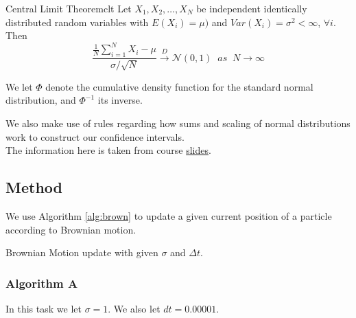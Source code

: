 \begin{theorem}{Central Limit Theorem}{clt}
Let $X_1, X_2, \dots, X_N$ be independent identically distributed random variables with $E(X_i) = \mu)$ and $Var(X_i) = \sigma^2 < \infty $, $\forall i$. Then
$$
    \frac{ \frac{1}{N} \sum^N_{i=1} X_i - \mu } {\sigma / \sqrt{N}} \xrightarrow{D} \mathcal{N}(0,1) \;\; as \;\; N \rightarrow \infty
$$
\end{theorem}

We let $\Phi$ denote the cumulative density function for the standard normal distribution, and $\Phi^{-1}$ its inverse.

We also make use of rules regarding how sums and scaling of normal distributions work to construct our confidence intervals.
\\

The information here is taken from course  \href{https://www.canvas.umu.se/courses/6705/files/1636770}{slides}.

\subsection{Method}
\label{sec:method2}


We use Algorithm \ref{alg:brown} to update a given current position of a particle according to Brownian motion.

\begin{algorithm}[H]
    \label{alg:brown}
    \caption{Brownian Motion update with given $\sigma$ and $\Delta t$.}
\end{algorithm}

\subsubsection{Algorithm A}
\label{sec:alg2A}

In this task we let $\sigma = 1$.  We also let $dt = 0.00001$.

